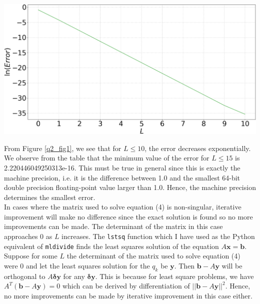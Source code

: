 \documentclass[12pt, a4paper]{article}
\begin{document}
\begin{minipage}{\textwidth}
	\includegraphics[width=\linewidth]{q2_fig1}

	\vspace*{-0.2cm}

	\label{q2_fig1}
\end{minipage}
\vspace{0.3cm}

From Figure \ref{q2_fig1}, we see that for $L \leq 10$, the error 
decreases exponentially. We observe from the table that the minimum 
value of the error for $L \leq 15$ is 2.220446049250313e-16.
This must be true in general since this is exactly the machine precision, 
i.e. it is the  difference between 1.0 and the smallest 64-bit double 
precision floating-point value larger than 1.0. Hence, the machine precision 
determines the smallest error.
\\

In cases where the matrix used to solve equation (4) is non-singular, 
iterative improvement will make no difference since the exact solution 
is found so no more improvements can be made. The determinant of the 
matrix in this case approaches 0 as $L$ increases. The \texttt{lstsq}
function which I have used as the Python equivalent of \texttt{mldivide} 
finds the least squares solution of the equation $A\mathbf{x} = \mathbf{b}$. 
Suppose for some $L$ the determinant of the matrix used to solve equation 
(4) were 0 and let the least squares solution for the $q_{k}$ be 
$\mathbf{y}$. Then $\mathbf{b}-A\mathbf{y}$ will be orthogonal to
$A\mathbf{\delta y}$ for any $\mathbf{\delta y}$. This is because
for least square problems, we have $A^{T}(\mathbf{b}-A\mathbf{y}) = 0$ 
which can be derived by differentiation of $||\mathbf{b}-A\mathbf{y}||^{2}$. 
Hence, no more improvements can be made by iterative improvement in 
this case either.\\
\end{document}
